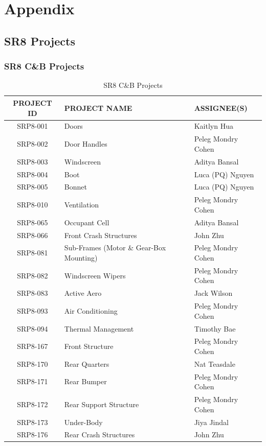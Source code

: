 \chapter{Appendix}
\label{appendix}

\section{SR8 Projects}
    \subsection{SR8 C\&B Projects}
        \begin{table}[h]
            \centering
            \renewcommand{\arraystretch}{1.2}
            \begin{tabularx}{\textwidth}{|c|X|X|}
            \hline
            \textbf{PROJECT ID} & \textbf{PROJECT NAME} & \textbf{ASSIGNEE(S)} \\
            \hline
            SRP8-001 & Doors & Kaitlyn Hua \\
            SRP8-002 & Door Handles & Peleg Mondry Cohen \\
            SRP8-003 & Windscreen & Aditya Bansal \\
            SRP8-004 & Boot & Luca (PQ) Nguyen \\
            SRP8-005 & Bonnet & Luca (PQ) Nguyen \\
            SRP8-010 & Ventilation & Peleg Mondry Cohen \\
            SRP8-065 & Occupant Cell & Aditya Bansal \\
            SRP8-066 & Front Crash Structures & John Zhu \\
            SRP8-081 & Sub-Frames \newline (Motor \& Gear-Box Mounting) & Peleg Mondry Cohen \\
            SRP8-082 & Windscreen Wipers & Peleg Mondry Cohen \\
            SRP8-083 & Active Aero & Jack Wilson \\
            SRP8-093 & Air Conditioning & Peleg Mondry Cohen \\
            SRP8-094 & Thermal Management & Timothy Bae \\
            SRP8-167 & Front Structure & Peleg Mondry Cohen \\
            SRP8-170 & Rear Quarters & Nat Teasdale \\
            SRP8-171 & Rear Bumper & Peleg Mondry Cohen \\
            SRP8-172 & Rear Support Structure & Peleg Mondry Cohen \\
            SRP8-173 & Under-Body & Jiya Jindal \\
            SRP8-176 & Rear Crash Structures & John Zhu \\
            \hline
            \end{tabularx}
            \caption{SR8 C\&B Projects}
            \label{tab:cb-projects}
        \end{table}

